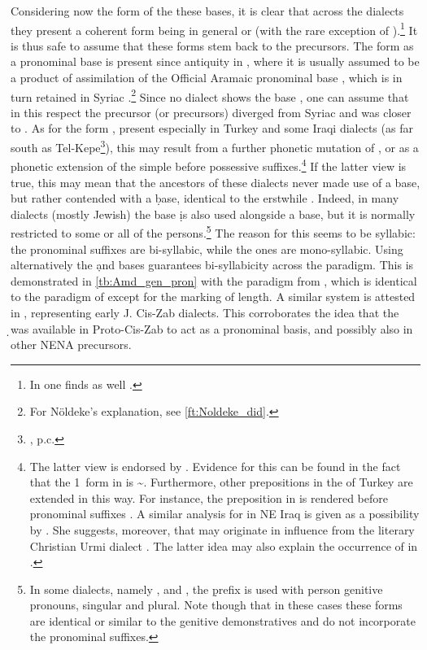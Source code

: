 Considering now the form of the these bases, it is clear that across the  dialects they present a coherent form being in general  or  (with the rare exception of \Sar {}).\footnote{In  \Midn one finds  as well \citep[43]{JastrowMidin}.} It is thus safe to assume that these forms stem back to the  precursors. The form  as a pronominal base is present since antiquity in \JBA, where it is usually assumed to be a product of assimilation of the Official Aramaic pronominal base , which is in turn retained in Syriac \citep[108]{BarAsherJBA}.\footnote{For Nöldeke's explanation, see \vref{ft:Noldeke_did}.} 
Since no  dialect shows the base , one can assume that in this respect the  precursor (or precursors) diverged from Syriac and was closer to \JBA. As for the form , present especially in Turkey and some Iraqi dialects (as far south as Tel-Kepe\footnote{, p.c.}), this may result from a further phonetic mutation of , or as a phonetic extension of the simple \lnk* {} before possessive suffixes.\footnote{The latter view is endorsed by \citet[72]{SinhaBespen}. Evidence for this can be found in the fact that the 1\sg\ form in \Bes is \~. Furthermore, other prepositions in the   of Turkey are extended in this way. For instance, the preposition  in \Gaz is rendered  before pronominal suffixes \citep[315]{GutmanGaznax}. A similar analysis for \Diy in NE Iraq is given as a possibility by \citet[93]{NapiorkowskaDiyana}. She suggests, moreover, that  may originate in influence from the literary Christian Urmi  dialect \citep[cf.][198]{MurreUrmi}. The latter idea may also explain the occurrence of  in \CSan.\label{ft:diy-}} If the latter view is true, this may mean that the ancestors of these dialects never made use of a  base, but rather contended with a \d base, identical to the erstwhile \lnk*. Indeed, in many  dialects (mostly Jewish) the base \d is also used alongside a  base, but it is normally restricted to some or all of the \pl* persons.\footnote{In some dialects, namely \JSan, \JSul and \Diy, the \d prefix is used  with \third person genitive pronouns, singular and plural.  Note though that in these cases these forms are identical or similar to the genitive demonstratives and do not incorporate the pronominal suffixes.} The reason for this seems to be syllabic: the \pl* pronominal suffixes are bi-syllabic, while the \sg* ones are mono-syllabic. Using alternatively the \d and  bases guarantees bi-syllabicity across the paradigm. This is demonstrated in \vref{tb:Amd_gen_pron} with the paradigm from \Amd \citep[81]{GreenblattAmidya}, which is identical to the paradigm of \JZax \citep[453]{CohenZakho} except for the marking of length. A similar system is attested in \Nrt \citep[135]{SabarNerwa}, representing early J. Cis-Zab dialects. This corroborates the idea that the \d \lnk* was  available in Proto-Cis-Zab to act as a pronominal basis, and possibly also in other NENA precursors.

